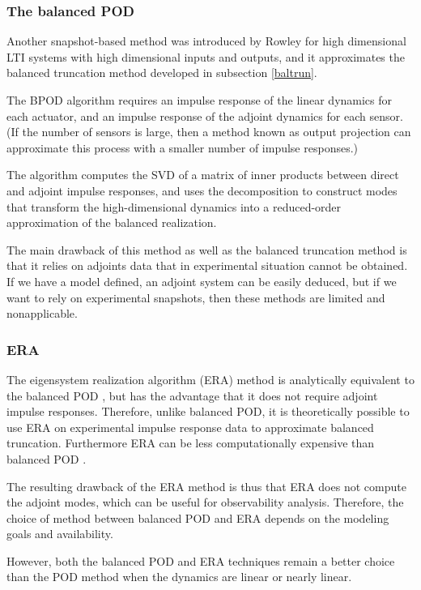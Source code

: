 \documentclass[12pt,lot, lof]{puthesis}
\begin{document}
\subsubsection{The balanced POD}
Another snapshot-based method was introduced by Rowley \cite{Rowley05} for high dimensional LTI systems with high dimensional inputs and outputs, and it approximates the balanced truncation method developed in subsection \ref{baltrun}.

The BPOD algorithm requires an impulse response of the linear dynamics for each actuator, and an impulse response of the adjoint dynamics for each sensor. (If the number of sensors is large, then a method known as output projection can approximate this process with a smaller number of impulse responses.) 

The algorithm computes the SVD of a matrix of inner products between direct and adjoint impulse responses, and uses the decomposition to construct modes that transform the high-dimensional dynamics into a reduced-order approximation of the balanced realization. 

The main drawback of this method  as well as the balanced truncation method is that it relies on adjoints data that in experimental situation cannot be obtained. If we have a model defined, an adjoint system can be easily deduced, but if we want to rely on experimental snapshots, then these methods are limited and nonapplicable. 

\subsubsection{ERA}

The eigensystem realization algorithm (ERA) method is analytically equivalent to the balanced POD \cite{Ma11}, but has the advantage that it does not require adjoint impulse responses. Therefore, unlike balanced POD, it is theoretically possible to use ERA on experimental impulse response data to approximate balanced truncation. Furthermore ERA can be less computationally expensive than balanced POD \cite{Ma11}. 

The resulting drawback of the ERA method is thus that ERA does not compute the adjoint modes, which can be useful for observability analysis. Therefore, the choice of method between balanced POD and ERA depends on the modeling goals and availability.
 
However, both the balanced POD and ERA techniques remain a better choice than the POD method when the dynamics are linear or nearly linear.
\end{document}
